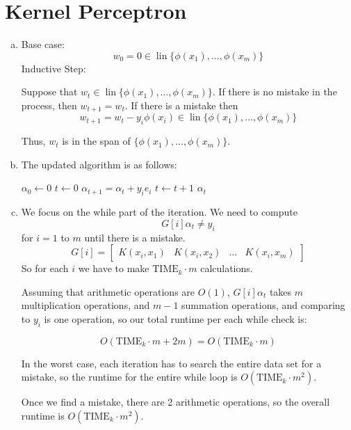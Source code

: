 \documentclass{amsart}
\newcommand{\TIMEk}{\mathrm{TIME}_k}
\DeclareMathOperator{\lin}{lin}
\DeclareMathOperator{\sign}{sign}
\theoremstyle{definition}
\begin{document}
\section{Kernel Perceptron}
\begin{enumerate}[(a)]
  \item 
    Base case:
      \[
        w_0 = 0 \in \lin\{\phi(x_1), \ldots, \phi(x_m)\}
      \]
    Inductive Step:
    
    Suppose that $w_t \in \lin\{\phi(x_1), \ldots, \phi(x_m)\}$. If there is no mistake in the process, then $w_{t+1} = w_t$. If there is a mistake then
    \[
      w_{t+1} = w_t - y_i \phi(x_i) \in \lin\{\phi(x_1), \ldots, \phi(x_m)\}
    \]

    Thus, $w_{t}$ is in the span of $\{\phi(x_1), \ldots, \phi(x_m)\}$. 
  \item 
    The updated algorithm is as follows:
    \begin{algorithmic}
      \State $\alpha_0 \gets 0$ 
      \State $t \gets 0$
      \While{$\exists i : \sign\left(\displaystyle\sum_{j = 1}^{m}\alpha_t[j] K(x_j, x_i)\right) \neq y_i $}
        \State $\alpha_{t+1} = \alpha_t + y_i e_i$
        \State $t \gets t+1$
      \EndWhile
      \State \Return $\alpha_t$
    \end{algorithmic}
  \item 
    We focus on the while part of the iteration. We need to compute 
    \[
      G[i]\alpha_t \neq y_i
    \]
    for $i = 1$ to $m$ until there is a mistake. 
    \[
      G[i] = \begin{bmatrix}
        K(x_i, x_1) & K(x_i, x_2) & \ldots & K(x_i, x_m)
      \end{bmatrix}
    \]
    So for each $i$ we have to make $\TIMEk \cdot m$ calculations. 

    Assuming that arithmetic operations are $O(1)$, $G[i] \alpha_t$ takes $m$ multiplication operations, and $m-1$ summation operations, and comparing to $y_i$ is one operation, so our total runtime per each while check is:

    \[
      O(\TIMEk\cdot m+ 2m) = O(\TIMEk \cdot m)
    \]

    In the worst case, each iteration has to search the entire data set for a mistake, so the runtime for the entire while loop is $O(\TIMEk \cdot m^2)$. 

    Once we find a mistake, there are 2 arithmetic operations, so the overall runtime is $O(\TIMEk \cdot m^2)$.


\end{enumerate}
\end{document}
